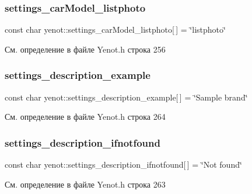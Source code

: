 \subsubsection{\texorpdfstring{settings\+\_\+car\+Model\+\_\+listphoto}{settings\_carModel\_listphoto}}
{\footnotesize\ttfamily const char yenot\+::settings\+\_\+car\+Model\+\_\+listphoto\mbox{[}$\,$\mbox{]} = \char`\"{}listphoto\char`\"{}}



См. определение в файле Yenot.\+h строка 256

\mbox{\label{namespaceyenot_a37f90b0081fe0617055470d46489ea0f}} 
\subsubsection{\texorpdfstring{settings\+\_\+description\+\_\+example}{settings\_description\_example}}
{\footnotesize\ttfamily const char yenot\+::settings\+\_\+description\+\_\+example\mbox{[}$\,$\mbox{]} = \char`\"{}Sample brand\char`\"{}}



См. определение в файле Yenot.\+h строка 264

\mbox{\label{namespaceyenot_a53b4bd62fd7a6e3abedfdfb47db53284}} 
\subsubsection{\texorpdfstring{settings\+\_\+description\+\_\+ifnotfound}{settings\_description\_ifnotfound}}
{\footnotesize\ttfamily const char yenot\+::settings\+\_\+description\+\_\+ifnotfound\mbox{[}$\,$\mbox{]} = \char`\"{}Not found\char`\"{}}



См. определение в файле Yenot.\+h строка 263

\mbox{\label{namespaceyenot_a6a7294929420d7790b72f733c98bcf56}} 
